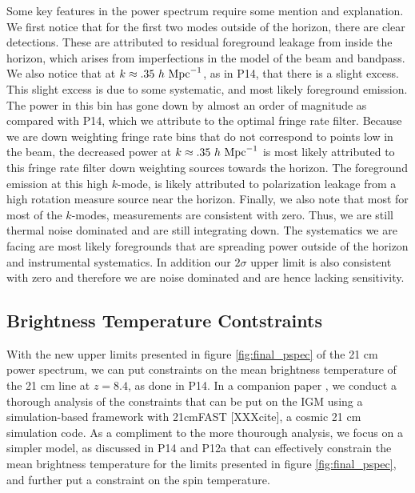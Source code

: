 \documentclass[twocolumn,numberedappendix]{emulateapj} \shorttitle{PSA64}
\begin{document}
Some key features in the power spectrum require some mention and explanation. We
first notice that for the first two modes outside of the horizon, there are
clear detections. These are attributed to residual foreground leakage from
inside the horizon, which arises from imperfections in the model of the beam and
bandpass. We also notice that at $k\approx{.35}\ h\ {\rm Mpc}^{-1}$, as in P14,
that there is a slight excess. This slight excess is
due to some systematic, and most likely foreground emission. The power in this
bin has gone down by almost an order of magnitude as compared with P14,
which we attribute to the optimal fringe rate filter.
Because we are down weighting fringe rate bins that do not correspond to points
low in the beam, the decreased power at $k\approx{.35}\ h\ {\rm Mpc}^{-1}$ is
most likely attributed to this fringe rate filter down weighting sources towards
the horizon. The foreground emission at this high $k$-mode, is likely attributed
to polarization leakage from a high rotation measure source near the horizon.
Finally, we also note that most for most of the $k$-modes, measurements are
consistent with zero. Thus, we are still thermal noise dominated and are still
integrating down. The systematics we are facing are most likely foregrounds that
are spreading power outside of the horizon and instrumental systematics. In
addition our $2\sigma$ upper limit is also consistent with zero and therefore we
are noise dominated and are hence lacking sensitivity.

\subsection{Brightness Temperature Contstraints}
With the new upper limits presented in figure \ref{fig:final_pspec} of the 21 cm
power spectrum,  we can put constraints on the mean brightness
temperature of the 21 cm line at $z=8.4$, as done in P14.
In a companion
paper \citep{pober_et_al2015a}, we conduct a thorough analysis of the
constraints that can be put on the IGM using a simulation-based framework with 21cmFAST
[XXXcite], a cosmic 21 cm simulation code. As a compliment to the more thourough
analysis, we focus on a simpler model, as discussed in P14 and P12a that can effectively
constrain the mean brightness temperature for the limits presented in
figure \ref{fig:final_pspec}, and further put a constraint on the spin temperature.
\end{document}
